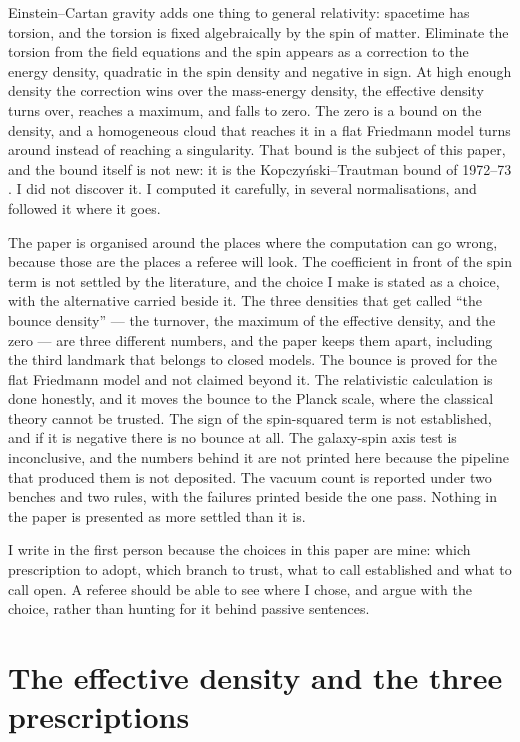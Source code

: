 \documentclass[11pt]{article}
\begin{document}
Einstein--Cartan gravity adds one thing to general relativity: spacetime
has torsion, and the torsion is fixed algebraically by the spin of
matter. Eliminate the torsion from the field equations and the spin
appears as a correction to the energy density, quadratic in the spin
density and negative in sign. At high enough density the correction wins
over the mass-energy density, the effective density turns over, reaches a
maximum, and falls to zero. The zero is a bound on the density, and a
homogeneous cloud that reaches it in a flat Friedmann model turns around
instead of reaching a singularity. That bound is the subject of this
paper, and the bound itself is not new: it is the Kopczy\'nski--Trautman
bound of 1972--73 \cite{Kopczynski72,Trautman73}. I did not discover it.
I computed it carefully, in several normalisations, and followed it where
it goes.

The paper is organised around the places where the computation can go
wrong, because those are the places a referee will look. The coefficient
in front of the spin term is not settled by the literature, and the
choice I make is stated as a choice, with the alternative carried beside
it. The three densities that get called ``the bounce density'' --- the
turnover, the maximum of the effective density, and the zero --- are
three different numbers, and the paper keeps them apart, including the
third landmark that belongs to closed models. The bounce is proved for
the flat Friedmann model and not claimed beyond it. The relativistic
calculation is done honestly, and it moves the bounce to the Planck
scale, where the classical theory cannot be trusted. The sign of the
spin-squared term is not established, and if it is negative there is no
bounce at all. The galaxy-spin axis test is inconclusive, and the
numbers behind it are not printed here because the pipeline that
produced them is not deposited. The vacuum count is reported under two
benches and two rules, with the failures printed beside the one pass.
Nothing in the paper is presented as more settled than it is.

I write in the first person because the choices in this paper are mine:
which prescription to adopt, which branch to trust, what to call
established and what to call open. A referee should be able to see where
I chose, and argue with the choice, rather than hunting for it behind
passive sentences.

\section{The effective density and the three prescriptions}
\end{document}
